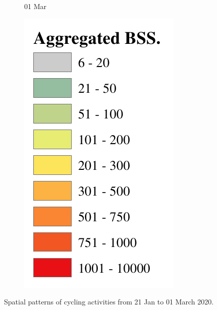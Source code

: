\documentclass[ijgi,submit,moreauthors,pdftex]{Definitions/mdpi}
\begin{document}
\begin{figure}[ht]
\begin{subfigure}{.23\textwidth}
\begin{tikzpicture}[inner sep = 0pt]
        \end{tikzpicture}
        \caption{01 Mar}
        \label{fig:pattern_03_01}
    \end{subfigure}
    \begin{subfigure}{.13\textwidth}
        \includegraphics[width=\textwidth]{Figures/Overall_spatial_patterns/legend5-eps-converted-to.pdf}
    \end{subfigure}
    \caption{Spatial patterns of cycling activities from 21 Jan to 01 March 2020.}
    \label{fig:full_spatial_pattern_2020}
\end{figure}
\end{document}
